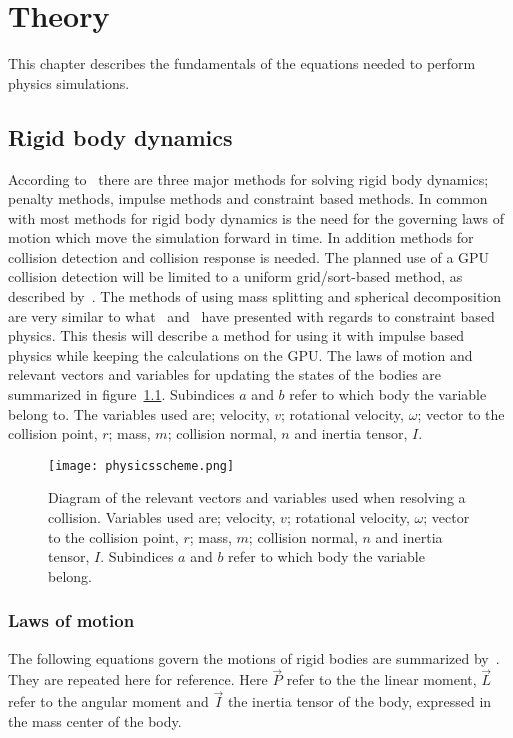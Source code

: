 \chapter{Theory}\label{cha:theory}
This chapter describes the fundamentals of the equations needed to perform physics simulations.
\section{Rigid body dynamics}
According to~\cite{baberrigid} there are three major methods for solving rigid body
dynamics; penalty methods, impulse methods and constraint based methods.
In common with most methods for rigid body dynamics is the need for the governing laws of
motion which move the simulation forward in time. In addition methods for collision detection
and collision response is needed. The planned use of a GPU collision
detection will be limited to a uniform grid/sort-based method, as described by~\cite{gpugems}.
The methods of using mass splitting and spherical decomposition are very similar
to what~\cite{flex} and~\cite{bulletPipeline} have presented with regards to
constraint based physics. This thesis will describe a method for using it with
impulse based physics while keeping the calculations on the GPU. The laws of motion and relevant vectors and variables
for updating the states of the bodies are summarized in figure~\ref{fig:diag}.
Subindices $a$ and $b$ refer to which body the variable belong to.
The variables used are; velocity, $v$; rotational velocity, $\omega$; vector to
the collision point, $r$; mass, $m$; collision normal, $n$ and inertia tensor, $I$.

\begin{figure}[H]
  \centering
  \texttt{[image: physicsscheme.png]}
  \caption{Diagram of the relevant vectors and variables used when resolving a collision. Variables used are; velocity, $v$; rotational velocity, $\omega$; vector to
  the collision point, $r$; mass, $m$; collision normal, $n$ and inertia tensor, $I$.
   Subindices $a$ and $b$ refer to which body the variable belong.}
  \label{fig:diag}
\end{figure}

\subsection{Laws of motion}
The following equations govern the motions of rigid bodies are summarized by~\cite{hansson}. They are repeated here for reference.
Here $\vec{P}$ refer to the the linear moment, $\vec{L}$ refer to the angular
moment and $\vec{I}$ the inertia tensor of the body, expressed in the mass center of the body.

